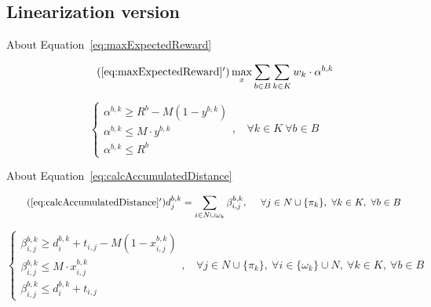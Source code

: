 \documentclass[12pt ]{article}
\begin{document}
\subsection{Linearization version}

About Equation~\ref{eq:maxExpectedReward}

\begin{equation} \tag{\ref{eq:maxExpectedReward}$^\prime$}
	\max_x \sum_{ b \in B} \sum_{k \in K} w_k \cdot \alpha^{b,k}
	\label{eq:maxExpectedReward_linearization}
\end{equation}

\begin{equation}
	\begin{cases} 
      	\alpha^{b,k} \ge R^b - M ( 1 - y^{b,k} ) \\
      	\alpha^{b,k} \le M \cdot y^{b,k} \\
      	\alpha^{b,k} \le R^b
   	\end{cases}
   	,~~~~\forall k \in K~\forall b \in B
\label{eq:linearization_alpha}
\end{equation}

\vspace{0.5cm}

About Equation~\ref{eq:calcAccumulatedDistance}

\begin{equation} \tag{\ref{eq:calcAccumulatedDistance}$^\prime$}
	d_j^{b,k} = \sum_{ i \in N \cup \omega_k} \beta^{b,k}_{i,j},~~~~\forall j \in N \cup \{ \pi_{k} \},~\forall k \in K,~\forall b \in B
	\label{eq:calcAccumulatedDistance_linearization}
\end{equation}

\begin{equation}
	\begin{cases} 
      	\beta^{b,k}_{i,j} \ge d^{b,k}_{i} + t_{i,j} - M ( 1 - x^{b,k}_{i,j} ) \\
      	\beta^{b,k}_{i,j} \le M \cdot x^{b,k}_{i,j} \\
      	\beta^{b,k}_{i,j} \le d^{b,k}_{i} + t_{i,j}
   	\end{cases}
   	,~~~~\forall j \in N \cup \{ \pi_{k} \},~\forall i \in \{ \omega_{k} \} \cup N,~\forall k \in K,~\forall b \in B
   \label{eq:linearization_beta}
\end{equation}
\end{document}
